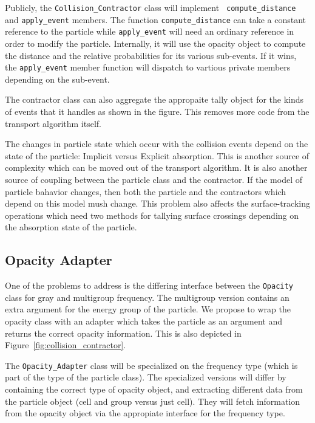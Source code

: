 \documentclass[memo]{ResearchNote}
\begin{document}
Publicly, the {\tt Collision\_Contractor} class will implement {\tt
  compute\_distance} and {\tt apply\_event} members.  The function
{\tt compute\_distance} can take a constant reference to the particle
while {\tt apply\_event} will need an ordinary reference in order to
modify the particle.  Internally, it will use the opacity object to
compute the distance and the relative probabilities for its various
sub-events.  If it wins, the {\tt apply\_event} member function will
dispatch to vartious private members depending on the sub-event.

The contractor class can also aggregate the appropaite tally object
for the kinds of events that it handles as shown in the figure. This
removes more code from the transport algorithm itself.

The changes in particle state which occur with the collision events
depend on the state of the particle: Implicit versus Explicit
absorption. This is another source of complexity which can be moved
out of the transport algorithm. It is also another source of coupling
between the particle class and the contractor. If the model of
particle bahavior changes, then both the particle and the contractors
which depend on this model mush change. This problem also affects the
surface-tracking operations which need two methods for tallying
surface crossings depending on the absorption state of the particle. 

\subsection{Opacity Adapter}

One of the problems to address is the differing interface between the
{\tt Opacity} class for gray and multigroup frequency.  The multigroup
version contains an extra argument for the energy group of the
particle. We propose to wrap the opacity class with an adapter which
takes the particle as an argument and returns the correct opacity
information. This is also depicted in
Figure~\ref{fig:collision_contractor}. 

The {\tt Opacity\_Adapter} class will be specialized on the frequency
type (which is part of the type of the particle class). The
specialized versions will differ by containing the correct type of
opacity object, and extracting different data from the particle object
(cell and group versus just cell). They will fetch information from
the opacity object via the appropiate interface for the frequency
type.
\end{document}
